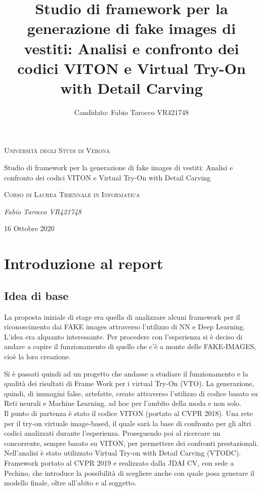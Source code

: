\documentclass[final, 11pt]{article}
\title{Studio di framework per la generazione di fake images di vestiti: Analisi e confronto dei codici VITON e Virtual Try-On with Detail Carving}
\author{ Candidato: Fabio Tarocco VR421748}
\begin{document}
	\clearpage
	
\begin{titlepage}
	\centering
	\vspace*{\fill}
	{\scshape\LARGE Università degli Studi di Verona \par}
	\vspace{1.5cm}
	{\huge Studio di framework per la generazione di fake images di vestiti: Analisi e confronto dei codici VITON e Virtual Try-On with Detail Carving \par}
	\vspace{0.5cm}
	{\scshape  Corso di Laurea Triennale in Informatica \par}
	\vspace{1cm}
	{\Large\itshape Fabio Tarocco VR421748 \par}
	\vspace{1cm}
	\vspace{5cm}
	\vspace*{\fill}
	{\large 16 Ottobre 2020 \par}
\end{titlepage}
	\newpage
	\thispagestyle{plain} %
	\mbox{}
	\clearpage
	
	\tableofcontents
	\newpage
	\section{Introduzione al report}
	\subsection{Idea di base}
	La proposta iniziale di stage era quella di analizzare alcuni framework per il riconoscimento dai FAKE images attraverso l’utilizzo di NN e Deep Learning. L’idea era alquanto interessante.
	Per procedere con l’esperienza si è deciso di andare a capire il funzionamento di quello che c’è a monte delle FAKE-IMAGES, cioè la loro creazione.
	
	Si è passati quindi ad un progetto che andasse a studiare il funzionamento e la qualità dei risultati di Frame Work per i virtual Try-On (VTO). La generazione, quindi, di immagini false, artefatte, create attraverso l’utilizzo di codice basato su Reti neurali e Machine Learning, ad hoc per l’ambito della moda e non solo.\\
	Il punto di partenza è stato il codice VITON (portato al CVPR 2018). Una rete per il try-on virtuale image-based, il quale sarà la base di confronto per gli altri codici analizzati durante l’esperienza.
	Proseguendo poi al ricercare un concorrente, sempre basato su VITON, per permettere dei confronti prestazionali. Nell'analisi è stato utilizzato Virtual Try-on with Detail Carving (VTODC). Framework portato al CVPR 2019 e realizzato dalla JDAI CV, con sede a Pechino, che introduce la possibilità di scegliere anche con quale posa generare il modello finale, oltre all’abito e al soggetto.
	
\end{document}

